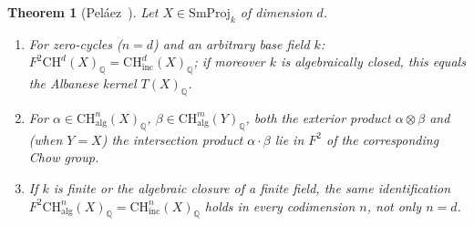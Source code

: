 \documentclass[12pt,a4paper]{article}
\newtheorem{theorem}{Theorem}[section]
\theoremstyle{definition}
\newcommand{\CH}{\mathrm{CH}}
\newcommand{\Q}{\mathbb{Q}}
\newcommand{\SmProj}{\mathrm{SmProj}}
\newcommand{\alg}{\mathrm{alg}}
\newcommand{\inc}{\mathrm{inc}}
\begin{document}
\begin{theorem}[Peláez~\cite{PelRey25}]\label{thm:app-incequiv}
Let $X\in\SmProj_k$ of dimension $d$.
\begin{enumerate}
\item For \emph{zero-cycles} ($n=d$) and an arbitrary base field $k$:
  $F^2\CH^d(X)_\Q=\CH^d_\inc(X)_\Q$; if moreover $k$ is algebraically closed,
  this equals the Albanese kernel $T(X)_\Q$.
\item For $\alpha\in\CH^n_{\alg}(X)_\Q$, $\beta\in\CH^m_{\alg}(Y)_\Q$, both the
  exterior product $\alpha\otimes\beta$ and (when $Y=X$) the intersection
  product $\alpha\cdot\beta$ lie in $F^2$ of the corresponding Chow group.
\item If $k$ is finite or the algebraic closure of a finite field, the same
  identification $F^2\CH^n_{\alg}(X)_\Q=\CH^n_\inc(X)_\Q$ holds in
  \emph{every} codimension $n$, not only $n=d$.
\end{enumerate}
\end{theorem}
\end{document}
